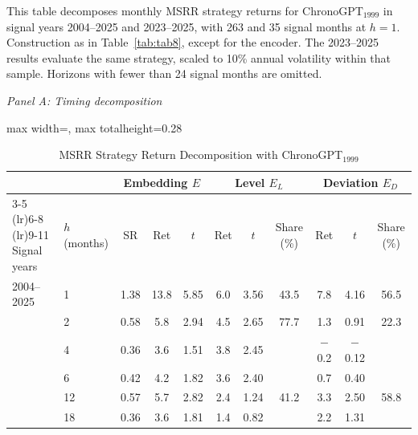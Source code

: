 \begin{table}[htbp]
\centering
\caption{MSRR Strategy Return Decomposition with ChronoGPT$_{1999}$}
\label{tab:tabB_attribution}
\begin{minipage}{\linewidth}\footnotesize
This table decomposes monthly MSRR strategy returns for ChronoGPT$_{1999}$ in signal years 2004--2025 and 2023--2025, with 263 and 35 signal months at $h=1$. Construction as in Table~\ref{tab:tab8}, except for the encoder. The 2023--2025 results evaluate the same strategy, scaled to 10\% annual volatility within that sample. Horizons with fewer than 24 signal months are omitted.
\end{minipage}
\medskip

{\footnotesize
\textit{Panel A: Timing decomposition}\\[2pt]
\begin{adjustbox}{max width=\linewidth, max totalheight=0.28\textheight}
\begin{tabular}{llccccccccc}
\toprule
\multicolumn{2}{c}{} & \multicolumn{3}{c}{Embedding $E$} & \multicolumn{3}{c}{Level $E_L$} & \multicolumn{3}{c}{Deviation $E_D$} \\
\cmidrule(lr){3-5} \cmidrule(lr){6-8} \cmidrule(lr){9-11}
Signal years & $h$ (months) & SR & Ret & $t$ & Ret & $t$ & Share (\%) & Ret & $t$ & Share (\%) \\
\midrule
2004--2025 & 1 & \phantom{$-$}1.38 & \phantom{$-$}13.8 & \phantom{$-$}5.85 & \phantom{$-$}6.0 & \phantom{$-$}3.56 & \phantom{$-$}43.5 & \phantom{$-$0}7.8 & \phantom{$-$}4.16 & \phantom{0}56.5 \\
 & 2 & \phantom{$-$}0.58 & \phantom{$-$0}5.8 & \phantom{$-$}2.94 & \phantom{$-$}4.5 & \phantom{$-$}2.65 & \phantom{$-$}77.7 & \phantom{$-$0}1.3 & \phantom{$-$}0.91 & \phantom{0}22.3 \\
 & 4 & \phantom{$-$}0.36 & \phantom{$-$0}3.6 & \phantom{$-$}1.51 & \phantom{$-$}3.8 & \phantom{$-$}2.45 &  & \phantom{0}$-$0.2 & $-$0.12 &  \\
 & 6 & \phantom{$-$}0.42 & \phantom{$-$0}4.2 & \phantom{$-$}1.82 & \phantom{$-$}3.6 & \phantom{$-$}2.40 &  & \phantom{$-$0}0.7 & \phantom{$-$}0.40 &  \\
 & 12 & \phantom{$-$}0.57 & \phantom{$-$0}5.7 & \phantom{$-$}2.82 & \phantom{$-$}2.4 & \phantom{$-$}1.24 & \phantom{$-$}41.2 & \phantom{$-$0}3.3 & \phantom{$-$}2.50 & \phantom{0}58.8 \\
 & 18 & \phantom{$-$}0.36 & \phantom{$-$0}3.6 & \phantom{$-$}1.81 & \phantom{$-$}1.4 & \phantom{$-$}0.82 &  & \phantom{$-$0}2.2 & \phantom{$-$}1.31 &  \\

\end{tabular}
\end{adjustbox}}
\end{table}

